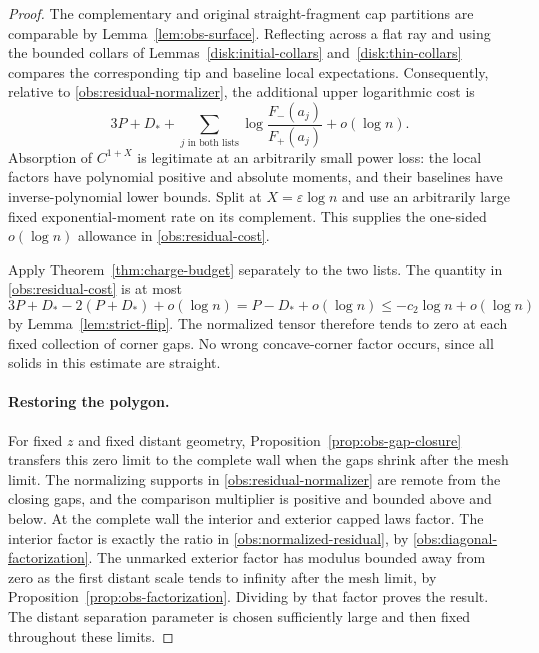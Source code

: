 \begin{proof}
The complementary and original straight-fragment cap partitions are
comparable by Lemma~\ref{lem:obs-surface}.  Reflecting across a flat
ray and using the bounded collars of Lemmas~\ref{disk:initial-collars}
and~\ref{disk:thin-collars} compares the corresponding tip
and baseline local expectations.  Consequently, relative to
\eqref{obs:residual-normalizer}, the additional upper logarithmic
cost is
\begin{equation}
 3P+D_*+\sum_{j\text{ in both lists}}
           \log\frac{F_-(a_j)}{F_+(a_j)}+o(\log n).
 \label{obs:residual-cost}
\end{equation}
Absorption of $C^{1+X}$ is legitimate at an arbitrarily small power
loss: the local factors have polynomial positive and absolute
moments, and their baselines have inverse-polynomial lower bounds.
Split at $X=\varepsilon\log n$ and use an arbitrarily large fixed
exponential-moment rate on its complement.  This supplies the
one-sided $o(\log n)$ allowance in \eqref{obs:residual-cost}.

Apply Theorem~\ref{thm:charge-budget} separately to the two lists.
The quantity in \eqref{obs:residual-cost} is at most
\[
 3P+D_*-2(P+D_*)+o(\log n)
 =P-D_*+o(\log n)
 \le-c_2\log n+o(\log n)
\]
by Lemma~\ref{lem:strict-flip}.  The normalized tensor therefore
tends to zero at each fixed collection of corner gaps.  No wrong
concave-corner factor occurs, since all solids in this estimate are
straight.

\paragraph{Restoring the polygon.}
For fixed $z$ and fixed distant geometry,
Proposition~\ref{prop:obs-gap-closure} transfers this zero limit to
the complete wall when the gaps shrink after the mesh limit.  The
normalizing supports in \eqref{obs:residual-normalizer} are remote
from the closing gaps, and the comparison multiplier is positive and
bounded above and below.  At the complete wall the interior and
exterior capped laws factor.  The interior factor is exactly
the ratio in \eqref{obs:normalized-residual}, by
\eqref{obs:diagonal-factorization}.
The unmarked exterior factor has modulus bounded away from zero
as the first distant scale tends to infinity after the mesh limit,
by Proposition~\ref{prop:obs-factorization}.  Dividing by that
factor proves the result.  The distant separation parameter is
chosen sufficiently large and then fixed throughout these limits.
\end{proof}

